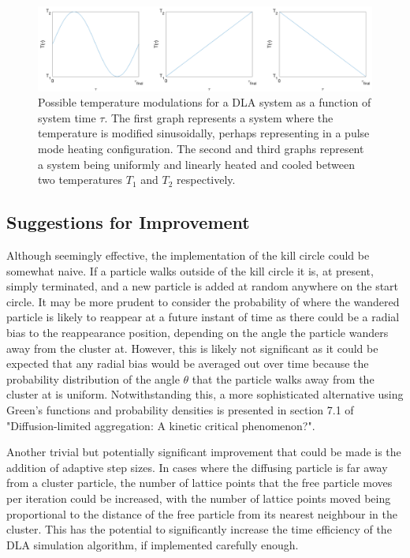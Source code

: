 \documentclass[11pt]{iopart}
\begin{document}
\begin{figure}[t]
  \centering
  \includegraphics[width=\linewidth]{images/temps.png}
  \caption{Possible temperature modulations for a DLA system as a function of system time $\tau$. The first graph represents a system where the temperature is modified sinusoidally, perhaps representing in a pulse mode heating configuration. The second and third graphs represent a system being uniformly and linearly heated and cooled between two temperatures $T_1$ and $T_2$ respectively.}
  \label{fig:temps}
\end{figure}

\subsection{Suggestions for Improvement}
Although seemingly effective, the implementation of the kill circle could be somewhat naive. If a particle walks outside of the kill circle it is, at present, simply terminated, and a new particle is added at random anywhere on the start circle. It may be more prudent to consider the probability of where the wandered particle is likely to reappear at a future instant of time as there could be a radial bias to the reappearance position, depending on the angle the particle wanders away from the cluster at. However, this is likely not significant as it could be expected that any radial bias would be averaged out over time because the probability distribution of the angle $\theta$ that the particle walks away from the cluster at is uniform.  Notwithstanding this, a more sophisticated alternative using Green's functions and probability densities is presented in section 7.1 of "Diffusion-limited aggregation: A kinetic critical phenomenon?"\cite{dla2}. 

Another trivial but potentially significant improvement that could be made is the addition of adaptive step sizes. In cases where the diffusing particle is far away from a cluster particle, the number of lattice points that the free particle moves per iteration could be increased, with the number of lattice points moved being proportional to the distance of the free particle from its nearest neighbour in the cluster. This has the potential to significantly increase the time efficiency of the DLA simulation algorithm, if implemented carefully enough.
\end{document}
